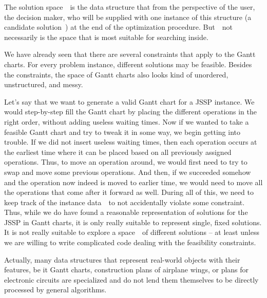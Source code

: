 %
\label{sec:searchSpace}%
%
The solution space~\solutionSpace\ is the data structure that  from the perspective of the user, the decision maker, who will be supplied with one instance of this structure (a candidate solution~\solspel) at the end of the optimization procedure.
But~\solutionSpace\ not necessarily is the space that is most suitable for searching inside.

We have already seen that there are several constraints that apply to the Gantt charts.
For every problem instance, different solutions may be feasible.
Besides the constraints, the space of Gantt charts also looks kind of unordered, unstructured, and messy.

Let's say that we want to generate a valid Gantt chart for a \gls{JSSP} instance.
We would step-by-step fill the Gantt chart by placing the different operations in the right order, without adding useless waiting times.
Now if we wanted to take a feasible Gantt chart and try to tweak it in some way, we begin getting into trouble.
If we did not insert useless waiting times, then each operation occurs at the earliest time where it can be placed based on all previously assigned operations.
Thus, to move an operation around, we would first need to try to swap and move some previous operations.
And then, if we succeeded somehow and the operation now indeed is moved to earlier time, we would need to move all the operations that come after it forward as well.
During all of this, we need to keep track of the instance data~\instance\ to not accidentally violate some constraint.
Thus, while we do have found a reasonable representation of solutions for the \gls{JSSP} in Gantt charts, it is only really suitable to represent single, fixed solutions.
It is not really suitable to explore a space~\solutionSpace\ of different solutions -- at least unless we are willing to write complicated code dealing with the feasibility constraints.

Actually, many data structures that represent real-world objects with their features, be it Gantt charts, construction plans of airplane wings, or plans for electronic circuits are specialized and do not lend them themselves to be directly processed by general algorithms.

